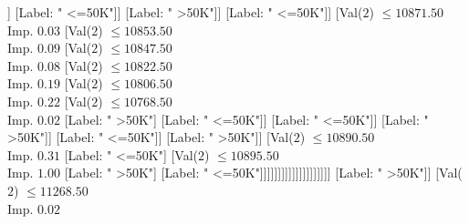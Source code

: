\documentclass[margin=10pt]{standalone}
\begin{document}
\begin{forest}
																																													[Val($2$) $ \leq 10657.50$ \\ Imp. $0.12$
																																														[Val($2$) $ \leq 10643.50$ \\ Imp. $0.21$
																																															[Val($2$) $ \leq 10528.50$ \\ Imp. $0.09$
																																																[Val($2$) $ \leq 10515.50$ \\ Imp. $0.27$
																																																	[Label: " <=50K"]
																																																	[Label: " >50K"]]
																																																[Label: " <=50K"]]
																																															[Label: " >50K"]]
																																														[Label: " <=50K"]]
																																													[Val($2$) $ \leq 10871.50$ \\ Imp. $0.03$
																																														[Val($2$) $ \leq 10853.50$ \\ Imp. $0.09$
																																															[Val($2$) $ \leq 10847.50$ \\ Imp. $0.08$
																																																[Val($2$) $ \leq 10822.50$ \\ Imp. $0.19$
																																																	[Val($2$) $ \leq 10806.50$ \\ Imp. $0.22$
																																																		[Val($2$) $ \leq 10768.50$ \\ Imp. $0.02$
																																																			[Label: " >50K"]
																																																			[Label: " <=50K"]]
																																																		[Label: " <=50K"]]
																																																	[Label: " >50K"]]
																																																[Label: " <=50K"]]
																																															[Label: " >50K"]]
																																														[Val($2$) $ \leq 10890.50$ \\ Imp. $0.31$
																																															[Label: " <=50K"]
																																															[Val($2$) $ \leq 10895.50$ \\ Imp. $1.00$
																																																[Label: " >50K"]
																																																[Label: " <=50K"]]]]]]]]]]]]]]]]]]]]
																													[Label: " >50K"]]
																												[Val($2$) $ \leq 11268.50$ \\ Imp. $0.02$

\end{forest}
\end{document}
